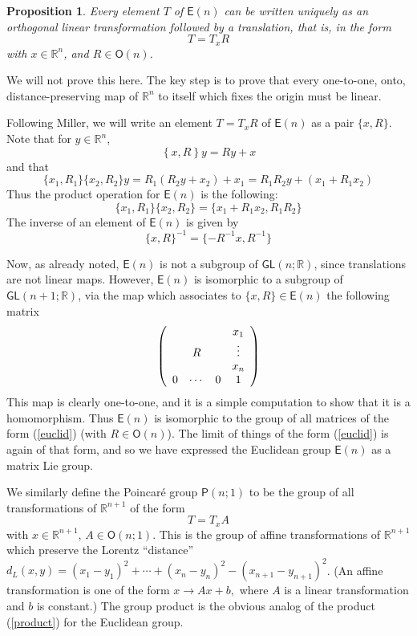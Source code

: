 \documentclass[12pt]{amsbook}
\theoremstyle{plain}
\newtheorem{proposition}[theorem]{Proposition}
\numberwithin{equation}{chapter}
\numberwithin{theorem}{chapter}
\begin{document}
\begin{proposition}
Every element $T$ of $\mathsf{E}(n)$ can be written uniquely as an orthogonal
linear transformation followed by a translation, that is, in the form
\[
T=T_{x}R
\]
with $x\in\mathbb{R}^{n}$, and $R\in\mathsf{O}(n)$.
\end{proposition}

We will not prove this here. The key step is to prove that every one-to-one,
onto, distance-preserving map of $\mathbb{R}^{n}$ to itself which fixes the
origin must be linear.

Following Miller, we will write an element $T=T_{x}R$ of $\mathsf{E}(n)$ as a
pair $\{x,R\}$. Note that for $y\in\mathbb{R}^{n}$,
\[
\left\{  x,R\right\}  y=Ry+x
\]
and that
\[
\{x_{1},R_{1}\}\{x_{2},R_{2}\}y=R_{1}(R_{2}y+x_{2})+x_{1}=R_{1}R_{2}%
y+(x_{1}+R_{1}x_{2})
\]
Thus the product operation for $\mathsf{E}(n)$ is the following:
\begin{equation}
\{x_{1},R_{1}\}\{x_{2},R_{2}\}=\{x_{1}+R_{1}x_{2},R_{1}R_{2}\}\label{product}%
\end{equation}
The inverse of an element of $\mathsf{E}(n)$ is given by
\[
\{x,R\}^{-1}=\{-R^{-1}x,R^{-1}\}
\]

Now, as already noted, $\mathsf{E}(n)$ is not a subgroup of $\mathsf{GL}%
(n;\mathbb{R})$, since translations are not linear maps. However,
$\mathsf{E}(n) $ is isomorphic to a subgroup of $\mathsf{GL}(n+1;\mathbb{R})$,
via the map which associates to $\{x,R\}\in\mathsf{E}(n)$ the following
matrix
\begin{equation}
\left(
\begin{array}
[c]{cccc}%
&  &  & x_{1}\\
& R &  & \vdots\\
&  &  &  x_{n}\\
0 & \cdots & 0 & 1
\end{array}
\right) \label{euclid}%
\end{equation}
This map is clearly one-to-one, and it is a simple computation to show that it
is a homomorphism. Thus $\mathsf{E}(n)$ is isomorphic to the group of all
matrices of the form (\ref{euclid}) (with $R\in\mathsf{O}(n)$). The limit of
things of the form (\ref{euclid}) is again of that form, and so we have
expressed the Euclidean group $\mathsf{E}(n)$ as a matrix Lie group.

We similarly define the Poincar\'{e} group $\mathsf{P}(n;1)$ to be the group
of all transformations of $\mathbb{R}^{n+1}$ of the form
\[
T=T_{x}A
\]
with $x\in\mathbb{R}^{n+1}$, $A\in\mathsf{O}(n;1)$. This is the group of
affine transformations of $\mathbb{R}^{n+1}$ which preserve the Lorentz
``distance'' $d_{L}(x,y)=(x_{1}-y_{1})^{2}+\cdots+(x_{n}-y_{n})^{2}%
-(x_{n+1}-y_{n+1})^{2}$. (An affine transformation is one of the form
$x\rightarrow Ax+b,$ where $A$ is a linear transformation and $b$ is
constant.) The group product is the obvious analog of the product
(\ref{product}) for the Euclidean group.
\end{document}
